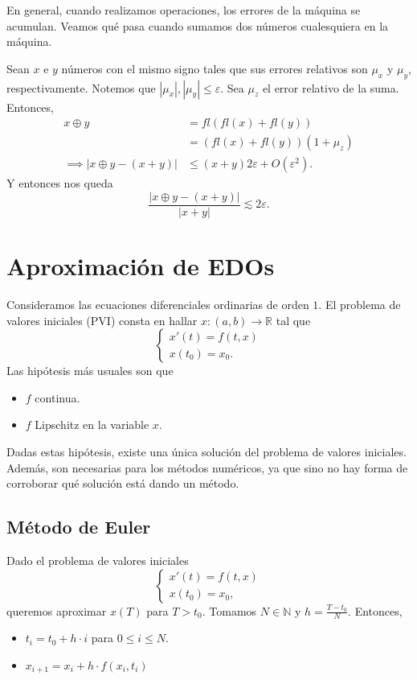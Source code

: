 \documentclass[12pt]{article}
\begin{document}
En general, cuando realizamos operaciones, los errores de la máquina se acumulan. Veamos qué pasa cuando sumamos dos números cualesquiera en la máquina.

Sean $x$ e $y$ números con el mismo signo tales que sus errores relativos son $\mu_x$ y $\mu_y$, respectivamente. Notemos que $|\mu_x|, |\mu_y| \leq \varepsilon$. Sea $\mu_z$ el error relativo de la suma. Entonces,
\begin{align*}
    x \oplus y &= fl(fl(x) + fl(y)) \\
    &= (fl(x) + fl(y))(1 + \mu_z) \\
    \implies \left| x \oplus y - (x+y) \right| &\leq (x + y) 2 \varepsilon + O(\varepsilon^{2}).
\end{align*}
Y entonces nos queda
$$
    \frac{\left| x \oplus y - (x + y) \right| }{\left| x + y \right| } \lesssim 2\varepsilon.
$$

\section{Aproximación de EDOs}

Consideramos las ecuaciones diferenciales ordinarias de orden $1$. El problema de valores iniciales (PVI) consta en hallar $x: (a, b) \to \mathbb{R}$ tal que 
$$
    \begin{cases}
        x'(t) = f(t, x) \\
        x(t_0) = x_0.
    \end{cases}
$$
Las hipótesis más usuales son que 
\begin{itemize}
    \item $f$ continua.
    \item $f$ Lipschitz en la variable $x$.
\end{itemize}
Dadas estas hipótesis, existe una única solución del problema de valores iniciales. Además, son necesarias para los métodos numéricos, ya que sino no hay forma de corroborar qué solución está dando un método.

\subsection{Método de Euler}

\begin{custombox}
    Dado el problema de valores iniciales
    $$
    \begin{cases}
        x'(t) = f(t, x) \\
        x(t_0) = x_0,
    \end{cases}
    $$
    queremos aproximar $x(T)$ para $T > t_0$. Tomamos $N \in \mathbb{N}$ y $h = \frac{T - t_0}{N}$. Entonces,
    \begin{itemize}
        \item $t_i = t_0 + h \cdot i$ para $0 \leq i \leq N$.
        \item $x_{i+1} = x_i + h \cdot f(x_i, t_i)$
    \end{itemize}

\end{custombox}
\end{document}
